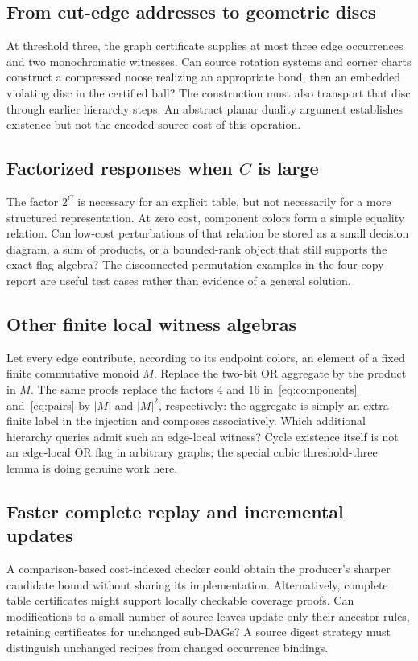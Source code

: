 \documentclass[11pt,a4paper]{article}
\theoremstyle{definition}
\theoremstyle{remark}
\begin{document}
\subsection{From cut-edge addresses to geometric discs}
At threshold three, the graph certificate supplies at most three edge occurrences and two monochromatic witnesses. Can source rotation systems and corner charts construct a compressed noose realizing an appropriate bond, then an embedded violating disc in the certified ball? The construction must also transport that disc through earlier hierarchy steps. An abstract planar duality argument establishes existence but not the encoded source cost of this operation.

\subsection{Factorized responses when \texorpdfstring{$C$}{C} is large}
The factor $2^C$ is necessary for an explicit table, but not necessarily for a more structured representation. At zero cost, component colors form a simple equality relation. Can low-cost perturbations of that relation be stored as a small decision diagram, a sum of products, or a bounded-rank object that still supports the exact flag algebra? The disconnected permutation examples in the four-copy report are useful test cases rather than evidence of a general solution.

\subsection{Other finite local witness algebras}
Let every edge contribute, according to its endpoint colors, an element of a fixed finite commutative monoid $M$. Replace the two-bit OR aggregate by the product in $M$. The same proofs replace the factors $4$ and $16$ in~\eqref{eq:components} and~\eqref{eq:pairs} by $|M|$ and $|M|^2$, respectively: the aggregate is simply an extra finite label in the injection and composes associatively. Which additional hierarchy queries admit such an edge-local witness? Cycle existence itself is not an edge-local OR flag in arbitrary graphs; the special cubic threshold-three lemma is doing genuine work here.

\subsection{Faster complete replay and incremental updates}
A comparison-based cost-indexed checker could obtain the producer's sharper candidate bound without sharing its implementation. Alternatively, complete table certificates might support locally checkable coverage proofs. Can modifications to a small number of source leaves update only their ancestor rules, retaining certificates for unchanged sub-DAGs? A source digest strategy must distinguish unchanged recipes from changed occurrence bindings.
\end{document}
